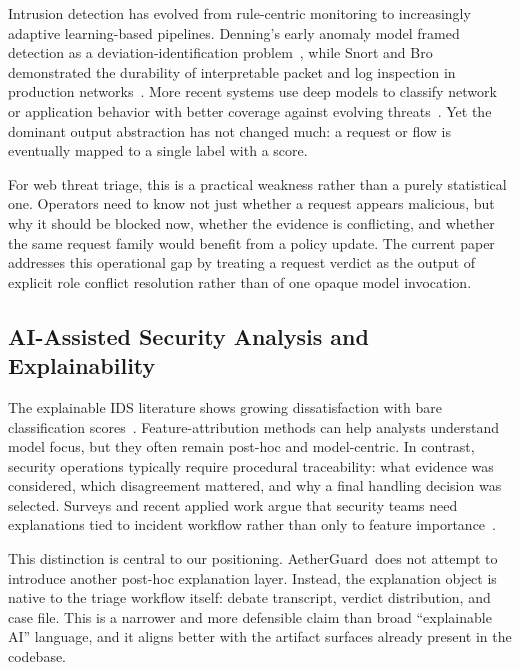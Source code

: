 \documentclass[pdflatex,sn-mathphys-num]{sn-jnl}
\newcommand{\system}{AetherGuard}
\begin{document}
Intrusion detection has evolved from rule-centric monitoring to increasingly adaptive learning-based pipelines. Denning's early anomaly model framed detection as a deviation-identification problem~\cite{denning1987intrusion}, while Snort and Bro demonstrated the durability of interpretable packet and log inspection in production networks~\cite{roesch1999snort,paxson1999bro}. More recent systems use deep models to classify network or application behavior with better coverage against evolving threats~\cite{doriguzzi2020lucid,holdbrook2024survey}. Yet the dominant output abstraction has not changed much: a request or flow is eventually mapped to a single label with a score.

For web threat triage, this is a practical weakness rather than a purely statistical one. Operators need to know not just whether a request appears malicious, but why it should be blocked now, whether the evidence is conflicting, and whether the same request family would benefit from a policy update. The current paper addresses this operational gap by treating a request verdict as the output of explicit role conflict resolution rather than of one opaque model invocation.

\subsection{AI-Assisted Security Analysis and Explainability}

The explainable IDS literature shows growing dissatisfaction with bare classification scores~\cite{neupane2022xids}. Feature-attribution methods can help analysts understand model focus, but they often remain post-hoc and model-centric. In contrast, security operations typically require procedural traceability: what evidence was considered, which disagreement mattered, and why a final handling decision was selected. Surveys and recent applied work argue that security teams need explanations tied to incident workflow rather than only to feature importance~\cite{neupane2022xids,barrere2022autonomous}.

This distinction is central to our positioning. \system\ does not attempt to introduce another post-hoc explanation layer. Instead, the explanation object is native to the triage workflow itself: debate transcript, verdict distribution, and case file. This is a narrower and more defensible claim than broad ``explainable AI'' language, and it aligns better with the artifact surfaces already present in the codebase.
\end{document}
